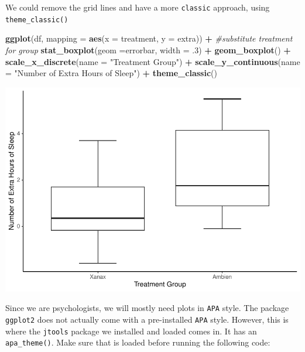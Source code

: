\documentclass[
]{book}
\newenvironment{Shaded}{\begin{snugshade}}{\end{snugshade}}
\newcommand{\AttributeTok}[1]{\textcolor[rgb]{0.13,0.29,0.53}{#1}}
\newcommand{\CommentTok}[1]{\textcolor[rgb]{0.56,0.35,0.01}{\textit{#1}}}
\newcommand{\DecValTok}[1]{\textcolor[rgb]{0.00,0.00,0.81}{#1}}
\newcommand{\FunctionTok}[1]{\textcolor[rgb]{0.13,0.29,0.53}{\textbf{#1}}}
\newcommand{\NormalTok}[1]{#1}
\newcommand{\SpecialCharTok}[1]{\textcolor[rgb]{0.81,0.36,0.00}{\textbf{#1}}}
\newcommand{\StringTok}[1]{\textcolor[rgb]{0.31,0.60,0.02}{#1}}
\begin{document}
We could remove the grid lines and have a more \texttt{classic} approach, using \texttt{theme\_classic()}

\begin{Shaded}
\begin{Highlighting}[]
\FunctionTok{ggplot}\NormalTok{(df, }\AttributeTok{mapping =} \FunctionTok{aes}\NormalTok{(}\AttributeTok{x =}\NormalTok{ treatment, }\AttributeTok{y =}\NormalTok{ extra)) }\SpecialCharTok{+} \CommentTok{\#substitute treatment for group}
  \FunctionTok{stat\_boxplot}\NormalTok{(}\AttributeTok{geom =}\StringTok{\textquotesingle{}errorbar\textquotesingle{}}\NormalTok{, }\AttributeTok{width =}\NormalTok{ .}\DecValTok{3}\NormalTok{) }\SpecialCharTok{+}
  \FunctionTok{geom\_boxplot}\NormalTok{() }\SpecialCharTok{+} 
  \FunctionTok{scale\_x\_discrete}\NormalTok{(}\AttributeTok{name =} \StringTok{"Treatment Group"}\NormalTok{) }\SpecialCharTok{+} 
  \FunctionTok{scale\_y\_continuous}\NormalTok{(}\AttributeTok{name =} \StringTok{"Number of Extra Hours of Sleep"}\NormalTok{) }\SpecialCharTok{+}
  \FunctionTok{theme\_classic}\NormalTok{()}
\end{Highlighting}
\end{Shaded}

\includegraphics{rintro_demo_files/figure-latex/unnamed-chunk-290-1.pdf}

Since we are psychologists, we will mostly need plots in \texttt{APA} style. The package \texttt{ggplot2} does not actually come with a pre-installed \texttt{APA} style. However, this is where the \texttt{jtools} package we installed and loaded comes in. It has an \texttt{apa\_theme()}. Make sure that is loaded before running the following code:
\end{document}
